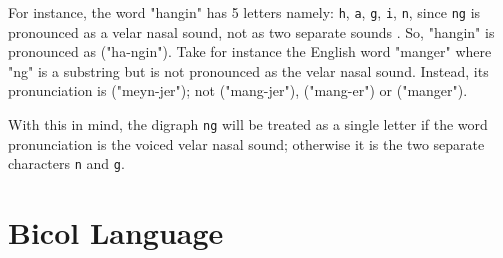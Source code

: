 For instance, the word "hangin" has 5 letters namely: \texttt{h}, \texttt{a}, \texttt{g}, \texttt{i}, \texttt{n},
since \texttt{ng} is pronounced as a velar nasal sound, not as two separate sounds
. So, "hangin" is pronounced as  ("ha-ngin").
Take for instance the English  word "manger" where "ng" is a substring
but is not pronounced as the velar nasal sound. Instead, its pronunciation is
 ("meyn-jer"); not
 ("mang-jer"),
 ("mang-er") or
 ("manger").

With this in mind, the digraph \texttt{ng} will be treated as a single letter if the word pronunciation is the voiced velar nasal sound; otherwise it is the two separate characters \texttt{n} and \texttt{g}. 

\section{Bicol Language}


